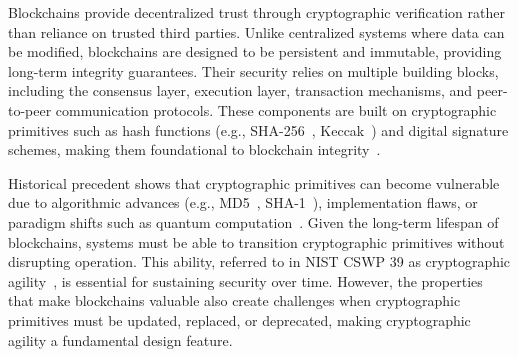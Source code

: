 







Blockchains provide decentralized trust through cryptographic verification rather than reliance on trusted third parties. 
Unlike centralized systems where data can be modified, blockchains are designed to be persistent and immutable, providing long-term integrity guarantees. 
Their security relies on multiple building blocks, including the consensus layer, execution layer, transaction mechanisms, and peer-to-peer communication protocols. 
These components are built on cryptographic primitives such as hash functions (e.g., SHA-256~\cite{NIST:FIPS1804}, Keccak~\cite{NIST:FIPS202}) and digital signature schemes, making them foundational to blockchain integrity~\cite{ESORICS:GieCreRas16}.

Historical precedent shows that cryptographic primitives can become vulnerable due to algorithmic advances (e.g., MD5~\cite{EC:WanYu05}, SHA-1~\cite{C:SBKAM17}), implementation flaws, or paradigm shifts such as quantum computation~\cite{FOCS:Shor94}. 
Given the long-term lifespan of blockchains, systems must be able to transition cryptographic primitives without disrupting operation. 
This ability, referred to in NIST CSWP 39 as cryptographic agility~\cite{NIST:BCC+25}, is essential for sustaining security over time. 
However, the properties that make blockchains valuable also create challenges when cryptographic primitives must be updated, replaced, or deprecated, making cryptographic agility a fundamental design feature.

